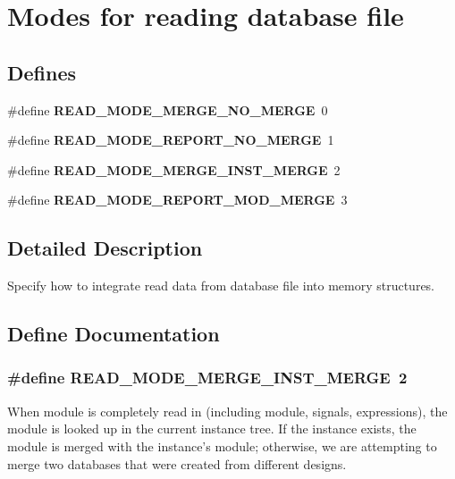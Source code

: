 \section{Modes for reading database file}
\label{group__read__modes}
\subsection*{Defines}
\begin{CompactItemize}
\item 
\#define {\bf READ\_\-MODE\_\-MERGE\_\-NO\_\-MERGE}\ 0
\item 
\#define {\bf READ\_\-MODE\_\-REPORT\_\-NO\_\-MERGE}\ 1
\item 
\#define {\bf READ\_\-MODE\_\-MERGE\_\-INST\_\-MERGE}\ 2
\item 
\#define {\bf READ\_\-MODE\_\-REPORT\_\-MOD\_\-MERGE}\ 3
\end{CompactItemize}


\subsection{Detailed Description}
Specify how to integrate read data from database file into memory structures. 

\subsection{Define Documentation}
\subsubsection{\setlength{\rightskip}{0pt plus 5cm}\#define READ\_\-MODE\_\-MERGE\_\-INST\_\-MERGE\ 2}\label{group__read__modes_a2}


When module is completely read in (including module, signals, expressions), the module is looked up in the current instance tree. If the instance exists, the module is merged with the instance's module; otherwise, we are attempting to merge two databases that were created from different designs. 
